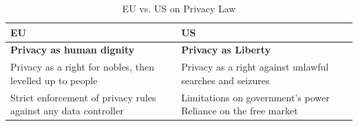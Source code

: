 \begin{table}[H]
\centering
\begin{tabular}{p{} p{}}
\toprule
\textbf{EU} & \textbf{US} \\
\midrule
\textbf{Privacy as human dignity} & \textbf{Privacy as Liberty} \\
Privacy as a right for nobles, then levelled up to people & Privacy as a right against unlawful searches and seizures \\
Strict enforcement of privacy rules against any data controller & Limitations on government's power Reliance on the free market \\
\bottomrule
\end{tabular}
\caption{EU vs. US on Privacy Law}
\label{tab:privacy_law}
\end{table}



